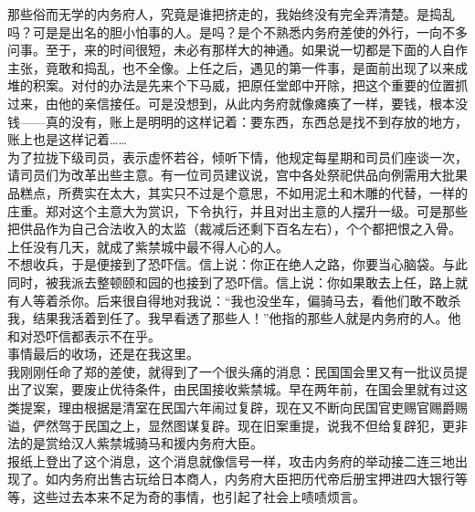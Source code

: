 那些俗而无学的内务府人，究竟是谁把挤走的，我始终没有完全弄清楚。是捣乱吗？可是是出名的胆小怕事的人。是吗？是个不熟悉内务府差使的外行，一向不多问事。至于，来的时间很短，未必有那样大的神通。如果说一切都是下面的人自作主张，竟敢和捣乱，也不全像。上任之后，遇见的第一件事，是面前出现了以来成堆的积案。对付的办法是先来个下马威，把原任堂郎中开除，把这个重要的位置抓过来，由他的亲信接任。可是没想到，从此内务府就像瘫痪了一样，要钱，根本没钱——真的没有，账上是明明的这样记着：要东西，东西总是找不到存放的地方，账上也是这样记着……\\

为了拉拢下级司员，表示虚怀若谷，倾听下情，他规定每星期和司员们座谈一次，请司员们为改革出些主意。有一位司员建议说，宫中各处祭祀供品向例需用大批果品糕点，所费实在太大，其实只不过是个意思，不如用泥土和木雕的代替，一样的庄重。郑对这个主意大为赏识，下令执行，并且对出主意的人摆升一级。可是那些把供品作为自己合法收入的太监（裁减后还剩下百名左右），个个都把恨之入骨。上任没有几天，就成了紫禁城中最不得人心的人。\\

不想收兵，于是便接到了恐吓信。信上说：你正在绝人之路，你要当心脑袋。与此同时，被我派去整顿颐和园的也接到了恐吓信。信上说：你如果敢去上任，路上就有人等着杀你。后来很自得地对我说：“我也没坐车，偏骑马去，看他们敢不敢杀我，结果我活着到任了。我早看透了那些人！”他指的那些人就是内务府的人。他和对恐吓信都表示不在乎。\\

事情最后的收场，还是在我这里。\\

我刚刚任命了郑的差使，就得到了一个很头痛的消息：民国国会里又有一批议员提出了议案，要废止优待条件，由民国接收紫禁城。早在两年前，在国会里就有过这类提案，理由根据是清室在民国六年闹过复辟，现在又不断向民国官吏赐官赐爵赐谥，俨然驾于民国之上，显然图谋复辟。现在旧案重提，说我不但给复辟犯，更非法的是赏给汉人紫禁城骑马和援内务府大臣。\\

报纸上登出了这个消息，这个消息就像信号一样，攻击内务府的举动接二连三地出现了。如内务府出售古玩给日本商人，内务府大臣把历代帝后册宝押进四大银行等等，这些过去本来不足为奇的事情，也引起了社会上啧啧烦言。\\

